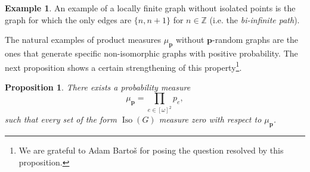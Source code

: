 \documentclass{amsart}
\newtheorem{prop}[theorem]{Proposition}
\theoremstyle{plain}
\theoremstyle{definition}
\newtheorem{exa}[theorem]{Example}
\theoremstyle{remark}
\numberwithin{equation}{section}
\newcommand{\IZ}{\mathbb{Z}}
\DeclareMathOperator{\iso}{Iso}
\begin{document}
\begin{exa}\label{pojedyncza nieskonczona sciezka nie jest losowalna}
An example of a locally finite graph without isolated points is the graph for which the only edges are $\{n, n+1\}$ for $n\in\IZ$ (i.e. the \emph{bi-infinite path}). 
\end{exa}





The natural examples of product measures $\mu_\textbf{p}$ without $\textbf{p}$-random graphs are the ones that generate specific non-isomorphic graphs with positive probability. The next proposition shows a certain strengthening of this property\footnote{We are grateful to Adam Barto\v{s} for posing the question resolved by this proposition.}.

\begin{prop}
There exists a probability measure
$$\mu_\mathbf{p}=\prod\limits_{e \in [\omega]^2}p_e,$$
 such that every set of the form $\iso(G)$ measure zero with respect to $\mu_\mathbf{p}$. 
\end{prop}    
\end{document}
